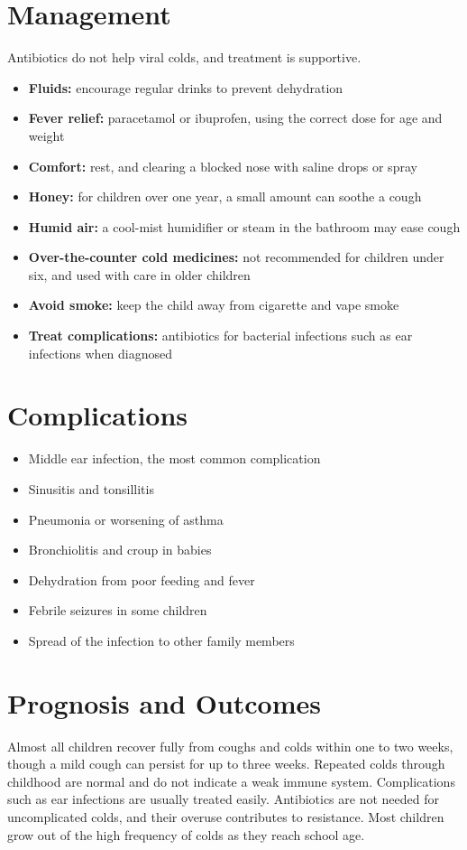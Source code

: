 \section*{Management}
Antibiotics do not help viral colds, and treatment is supportive.

\begin{itemize}
    \item \textbf{Fluids:} encourage regular drinks to prevent dehydration
    \item \textbf{Fever relief:} paracetamol or ibuprofen, using the correct dose for age and weight
    \item \textbf{Comfort:} rest, and clearing a blocked nose with saline drops or spray
    \item \textbf{Honey:} for children over one year, a small amount can soothe a cough
    \item \textbf{Humid air:} a cool-mist humidifier or steam in the bathroom may ease cough
    \item \textbf{Over-the-counter cold medicines:} not recommended for children under six, and used with care in older children
    \item \textbf{Avoid smoke:} keep the child away from cigarette and vape smoke
    \item \textbf{Treat complications:} antibiotics for bacterial infections such as ear infections when diagnosed
\end{itemize}

\section*{Complications}
\begin{itemize}
    \item Middle ear infection, the most common complication
    \item Sinusitis and tonsillitis
    \item Pneumonia or worsening of asthma
    \item Bronchiolitis and croup in babies
    \item Dehydration from poor feeding and fever
    \item Febrile seizures in some children
    \item Spread of the infection to other family members
\end{itemize}

\section*{Prognosis and Outcomes}
Almost all children recover fully from coughs and colds within one to two weeks, though a mild cough can persist for up to three weeks. Repeated colds through childhood are normal and do not indicate a weak immune system. Complications such as ear infections are usually treated easily. Antibiotics are not needed for uncomplicated colds, and their overuse contributes to resistance. Most children grow out of the high frequency of colds as they reach school age.

